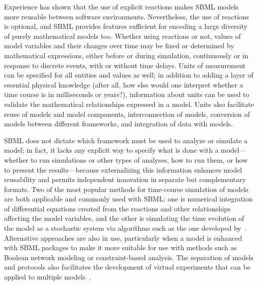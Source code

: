 \documentclass[]{draft-sbml-paper}
\begin{document}

Experience has shown that the use of explicit reactions makes SBML models more reusable between software environments.  Nevertheless, the use of reactions is optional, and SBML provides features sufficient for encoding a large diversity of purely mathematical models too.  Whether using reactions or not, values of model variables and their changes over time may be fixed or determined by mathematical expressions, either before or during simulation, continuously or in response to discrete events, with or without time delays.  Units of measurement can be specified for all entities and values as well; in addition to adding a layer of essential physical knowledge (after all, how else would one interpret whether a time course is in milliseconds or years?), information about units can be used to validate the mathematical relationships expressed in a model.  Units also facilitate reuse of models and model components, interconnection of models, conversion of models between different frameworks, and integration of data with models.

SBML does not dictate which framework must be used to analyze or simulate a model; in fact, it lacks any explicit way to specify what is done with a model---whether to run simulations or other types of analyses, how to run them, or how to present the results---because externalizing this information enhances model reusability and permits independent innovation in separate but complementary formats.  Two of the most popular methods for time-course simulation of models are both applicable and commonly used with SBML: one is numerical integration of differential equations created from the reactions and other relationships affecting the model variables, and the other is simulating the time evolution of the model as a stochastic system via algorithms such as the one developed by~\cite{gillespie1977exact}.  Alternative approaches are also in use, particularly when a model is enhanced with SBML packages to make it more suitable for use with methods such as Boolean network modeling or constraint-based analysis.  The separation of models and protocols also facilitates the development of virtual experiments that can be applied to multiple models~\citep{Cooper2015call}.
\end{document}
